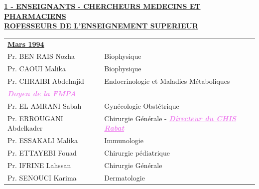 \iffalse

\textbf{\underline{1 - ENSEIGNANTS - CHERCHEURS MEDECINS ET PHARMACIENS \\ ROFESSEURS DE L'ENSEIGNEMENT SUPERIEUR}}


\vspace*{1em}


\begin{tabular}{l l}
  \multicolumn{2}{l}{\textbf{\underline{Mars 1994}}}\vspace*{.5em}\\
  Pr. BEN RAIS Nozha & \hspace*{2em} Biophysique \\
  Pr. CAOUI Malika & \hspace*{2em} Biophysique \\
  Pr. CHRAIBI Abdelmjid & \hspace*{2em} Endocrinologie et Maladies Métaboliques \\
  \textcolor{violet}{\textbf{\emph{\underline{Doyen de la FMPA }}}} & \\
  Pr. EL AMRANI Sabah	& \hspace*{2em} Gynécologie Obstétrique\\
  Pr. ERROUGANI Abdelkader &	\hspace*{2em} Chirurgie Générale  - \textcolor{violet}{\textbf{\emph{\underline{Directeur du CHIS Rabat}}}}\\ 

Pr. ESSAKALI Malika &	\hspace*{2em} Immunologie \\
Pr. ETTAYEBI Fouad	& \hspace*{2em} Chirurgie pédiatrique\\
Pr. IFRINE Lahssan &	\hspace*{2em} Chirurgie Générale\\
Pr. SENOUCI Karima &	\hspace*{2em} Dermatologie\\
 \end{tabular}
 
 \vspace*{1em}

